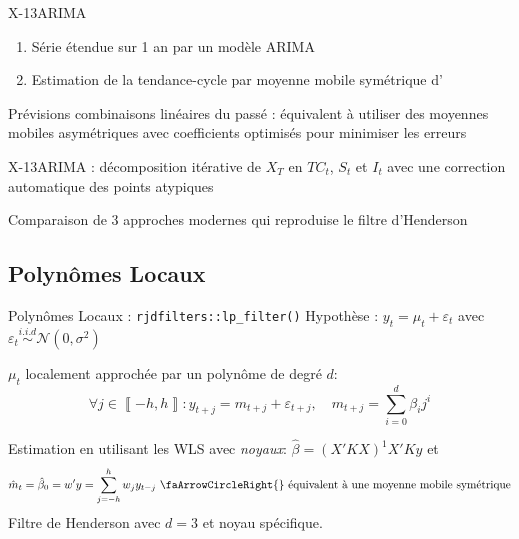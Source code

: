 \documentclass[10pt,xcolor=table,color={dvipsnames,usenames},ignorenonframetext,usepdftitle=false,french]{beamer}
\newcommand\1{\mathds{1}}
\begin{document}
\begin{frame}{X-13ARIMA}
\protect\hypertarget{x-13arima}{}
\begin{enumerate}
\item
  Série étendue sur 1 an par un modèle ARIMA
\item
  Estimation de la tendance-cycle par moyenne mobile symétrique
  d'
\end{enumerate}

\pause

\faArrowCircleRight{} Prévisions combinaisons linéaires du passé :
équivalent à utiliser des moyennes mobiles asymétriques avec
coefficients optimisés pour minimiser les erreurs

\bigskip

\pause

\faArrowCircleRight{} X-13ARIMA : décomposition itérative de \(X_T\) en
\(TC_t\), \(S_t\) et \(I_t\) avec une correction automatique des points
atypiques

\bigskip

\pause

\faArrowCircleRight{} Comparaison de 3 approches modernes qui reproduise
le filtre d'Henderson
\end{frame}

\hypertarget{polynuxf4mes-locaux}{%
\subsection{Polynômes Locaux}\label{polynuxf4mes-locaux}}

\begin{frame}{Polynômes Locaux : \texttt{rjdfilters::lp\_filter()}}
\protect\hypertarget{polynuxf4mes-locaux-rjdfilterslp_filter}{}
Hypothèse : \(y_t=\mu_t+\varepsilon_t\) avec
\(\varepsilon_t\overset{i.i.d}{\sim}\mathcal N(0,\sigma^2)\)

\(\mu_t\) localement approchée par un polynôme de degré \(d\): \[
\forall j\in\left\llbracket -h,h\right\rrbracket : y_{t+j}=m_{t+j}+\varepsilon_{t+j},\quad m_{t+j}=\sum_{i=0}^{d}\beta_{i}j^{i}
\]

\pause

Estimation en utilisant les WLS avec \emph{noyaux}:
\(\hat{\beta}=(X'KX)^{1}X'Ky\) et \[
\hat{m}_{t}=\hat\beta_0=w'y=\sum_{j=-h}^{h}w_{j}y_{t-j}
\text{ \faArrowCircleRight{} équivalent à une moyenne mobile symétrique}
\] \faArrowCircleRight{} Filtre de Henderson avec \(d=3\) et noyau
spécifique.
\end{frame}
\end{document}
